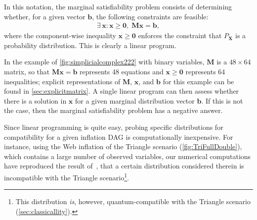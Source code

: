 \documentclass[aps,english,superscriptaddress,onecolumn,twoside,longbibliography,pra,floatfix,fleqn,nofootinbib]{revtex4-1}%
\theoremstyle{definition}
\newcounter{example}[section]
\begin{document}
In this notation, the marginal satisfiability problem consists of determining whether, for a given vector $\bm{b}$, the following constraints are feasible:
\begin{align}\label{eq:marginalproblemgeneric}
    \exists\, \bm{x} :{\bm{x} \geq \bm{0}} ,\; \bm{M}\bm{x}=\bm{b},
\end{align}
where the component-wise inequality $\bm{x}\geq\bm{0}$ enforces the constraint that $P_{\bm{X}}$ is a probability distribution. 
This is clearly a linear program.

In the example of \cref{fig:simplicialcomplex222} with binary variables, $\bm{M}$ is a $48\times 64$ matrix, so that $\bm{M}\bm{x}=\bm{b}$ represents 48 equations and $\bm{x} \geq \bm{0}$ represents 64 inequalities; explicit representations of  $\bm{M}$, $\bm{x}$, and $\bm{b}$ for this example can be found in \cref{sec:explicitmatrix}.
A single linear program can then assess whether there is a solution in $\bm{x}$ for a given marginal distribution vector $\bm{b}$. If this is not the case, then the marginal satisfiability problem has a negative answer. 

Since linear programming is quite easy, probing specific distributions for compatibility for a given inflation DAG is computationally inexpensive. For instance, using the Web inflation of the Triangle scenario (\cref{fig:TriFullDouble}), which contains a large number of observed variables, our numerical computations have reproduced the result of~\cite[Theorem~2.16]{fritz2012bell}, that a certain distribution considered therein is incompatible with the Triangle scenario\footnote{This distribution {\em is}, however, quantum-compatible with the Triangle scenario (\cref{sec:classicallity}).}.
\end{document}
